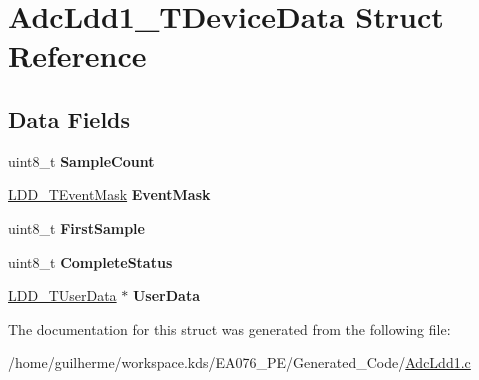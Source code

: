 \hypertarget{struct_adc_ldd1___t_device_data}{}\section{Adc\+Ldd1\+\_\+\+T\+Device\+Data Struct Reference}
\label{struct_adc_ldd1___t_device_data}
\subsection*{Data Fields}
\begin{DoxyCompactItemize}
\item 
\mbox{\label{struct_adc_ldd1___t_device_data_a63c6feb7c8434c756e9efe946ac16022}} 
uint8\+\_\+t {\bfseries Sample\+Count}
\item 
\mbox{\label{struct_adc_ldd1___t_device_data_a92f74625bd317f4bc9ad7c933ae386a9}} 
\hyperlink{group___p_e___types__module_gafbe7f4d4e51560399c3bdd0218584533}{L\+D\+D\+\_\+\+T\+Event\+Mask} {\bfseries Event\+Mask}
\item 
\mbox{\label{struct_adc_ldd1___t_device_data_a43345423b04146cab9b2bb6b2e65e553}} 
uint8\+\_\+t {\bfseries First\+Sample}
\item 
\mbox{\label{struct_adc_ldd1___t_device_data_a868226378cd7b823a1695a4531b35890}} 
uint8\+\_\+t {\bfseries Complete\+Status}
\item 
\mbox{\label{struct_adc_ldd1___t_device_data_ab3338de881bdb18ec6817f0cdccf286e}} 
\hyperlink{group___p_e___types__module_ga0b66a73f87238a782318aa0be7578e35}{L\+D\+D\+\_\+\+T\+User\+Data} $\ast$ {\bfseries User\+Data}
\end{DoxyCompactItemize}


The documentation for this struct was generated from the following file\+:\begin{DoxyCompactItemize}
\item 
/home/guilherme/workspace.\+kds/\+E\+A076\+\_\+\+P\+E/\+Generated\+\_\+\+Code/\hyperlink{_adc_ldd1_8c}{Adc\+Ldd1.\+c}\end{DoxyCompactItemize}

